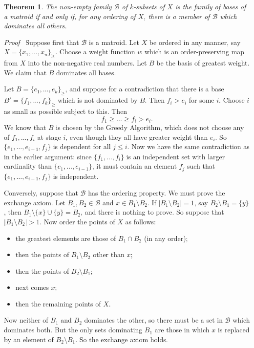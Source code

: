 \documentclass[12pt]{article}
\newtheorem{theorem}{Theorem}[section]
\newcommand{\head}[1]{\medbreak\noindent\textit{#1}\ }
\begin{document}
\begin{theorem}
The non-empty family $\mathcal{B}$ of $k$-subsets of $X$ is the
family of bases of a matroid if and only if, for any ordering
of $X$, there is a member of $\mathcal{B}$ which dominates all
others.
\label{t:dom}
\end{theorem}

\head{Proof} Suppose first that $\mathcal{B}$ is a matroid. Let $X$
be ordered in any manner, say $X=\{x_1, \ldots, x_n\}_{\ge}$.
Choose a weight function $w$ which is an order-preserving
map from $X$ into the non-negative real numbers. Let $B$ be
the basis of greatest weight. We claim that $B$ dominates
all bases.

Let $B=\{e_1, \ldots, e_k\}_{\ge}$, and suppose for a contradiction
that there is a base $B'=\{f_1, \ldots, f_k\}_{\ge}$ which is not
dominated by $B$. Then $f_i>e_i$ for some $i$. Choose $i$ as
small as possible subject to this. Then
\[f_1\ge\ldots\ge f_i>e_i.\]
We know that $B$ is chosen by the Greedy Algorithm, which
does not choose any of $f_1, \ldots, f_i$ at stage $i$, even
though they all have greater weight than $e_i$. So
$\{e_1, \ldots, e_{i-1}, f_j\}$ is dependent for all $j\le i$.
Now we have the same contradiction as in the earlier argument:
since $\{f_1, \ldots, f_i\}$ is an independent set with larger
cardinality than $\{e_1, \ldots, e_{i-1}\}$, it must contain
an element $f_j$ such that $\{e_1, \ldots,e_{i-1}, f_j\}$ is
independent.

\smallskip

Conversely, suppose that $\mathcal{B}$ has the ordering property.
We must prove the exchange axiom. 
Let $B_1,B_2\in\mathcal{B}$ and $x\in B_1\setminus B_2$. If
$|B_1\setminus B_2|=1$, say $B_2\setminus B_1=\{y\}$, then
$B_1\setminus\{x\}\cup\{y\}=B_2$, and there is nothing to prove.
So suppose that $|B_1\setminus B_2|>1$. Now
order the points of $X$ as follows:
\begin{itemize}
\item the greatest elements are those of $B_1\cap B_2$ (in any
order);
\item then the points of $B_1\setminus B_2$ other than $x$;
\item then the points of $B_2\setminus B_1$;
\item next comes $x$;
\item then the remaining points of $X$.
\end{itemize}
Now neither of $B_1$ and $B_2$ dominates the other, so there
must be a set in $\mathcal{B}$ which dominates both. But the
only sets dominating $B_1$ are those in which $x$ is replaced
by an element of $B_2\setminus B_1$. So the exchange axiom holds.
\end{document}
